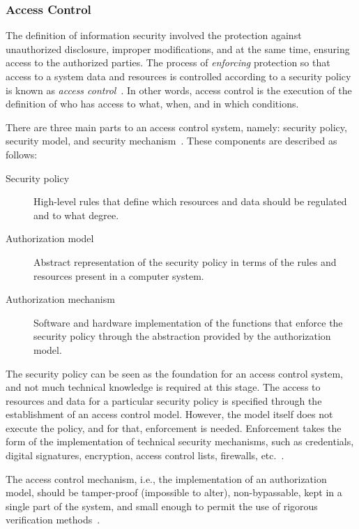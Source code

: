 \documentclass[12pt]{article}
\begin{document}
\subsubsection{Access Control}

The definition of information security involved the protection against unauthorized disclosure, improper modifications, and at the same time, ensuring access to the authorized parties. The process of \emph{enforcing} protection so that access to a system data and resources is controlled according to a security policy is known as \emph{access control}~\cite{access_02}. In other words, access control is the execution of the definition of who has access to what, when, and in which conditions.

There are three main parts to an access control system, namely: security policy, security model, and security mechanism~\cite{access_02}. These components are described as follows:

\begin{description}
\item[Security policy] High-level rules that define which resources and data should be regulated and to what degree. 
\item[Authorization model] Abstract representation of the security policy in terms of the rules and resources present in a computer system.
\item[Authorization mechanism] Software and hardware implementation of the functions that enforce the security policy through the abstraction provided by the authorization model. 
\end{description}

The security policy can be seen as the foundation for an access control system, and not much technical knowledge is required at this stage. The access to resources and data for a particular security policy is specified through the establishment of an access control model. However, the model itself does not execute the policy, and for that, enforcement is needed. Enforcement takes the form of the implementation of technical security mechanisms, such as credentials, digital signatures, encryption, access control lists, firewalls, etc.~\cite{access_01}.

The access control mechanism, i.e., the implementation of an authorization model, should be tamper-proof (impossible to alter), non-bypassable, kept in a single part of the system, and small enough to permit the use of rigorous verification methods~\cite{access_02}.
\end{document}
